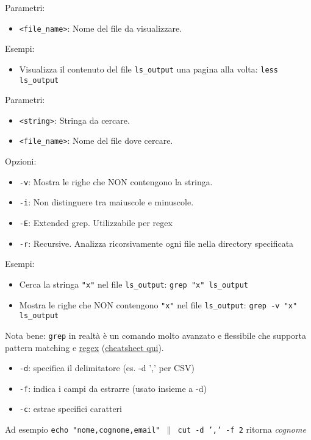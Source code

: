 \vskip3mm
Parametri:
\begin{itemize}
	\item \verb|<file_name>|: Nome del file da visualizzare.
\end{itemize}
Esempi:
\begin{itemize}
	\item Visualizza il contenuto del file \verb|ls_output| una pagina alla volta:
	      \vskip3mm
	      \verb|less ls_output|
\end{itemize}

\vskip3mm
Parametri:
\begin{itemize}
	\item \verb|<string>|: Stringa da cercare.
	\item \verb|<file_name>|: Nome del file dove cercare.
\end{itemize}
Opzioni:
\begin{itemize}
	\item \verb|-v|: Mostra le righe che NON contengono la stringa.
	\item \verb|-i|: Non distinguere tra maiuscole e minuscole.
	\item \verb|-E|: Extended grep. Utilizzabile per regex
	\item \verb|-r|: Recursive. Analizza ricorsivamente ogni file nella directory specificata
\end{itemize}
Esempi:
\begin{itemize}
	\item Cerca la stringa \verb|"x"| nel file \verb|ls_output|:
	      \vskip3mm
	      \verb|grep "x" ls_output|
	\item Mostra le righe che NON contengono \verb|"x"| nel file \verb|ls_output|:
	      \vskip3mm
	      \verb|grep -v "x" ls_output|
\end{itemize}
Nota bene: \verb|grep| in realtà è un comando molto avanzato e flessibile che supporta pattern matching e \href{https://en.wikipedia.org/wiki/Regular_expression}{regex} (\href{https://ryanstutorials.net/linuxtutorial/cheatsheetgrep.php}{cheatsheet qui}).


\label{cut command}
\begin{itemize}
	\item \verb|-d|: specifica il delimitatore (es. -d ',' per CSV)
	\item \verb|-f|: indica i campi da estrarre (usato insieme a -d)
	\item \verb|-c|: estrae specifici caratteri
\end{itemize}
Ad esempio \texttt{echo "nome,cognome,email" $ \| $ cut -d ',' -f 2} ritorna \textit{cognome}

